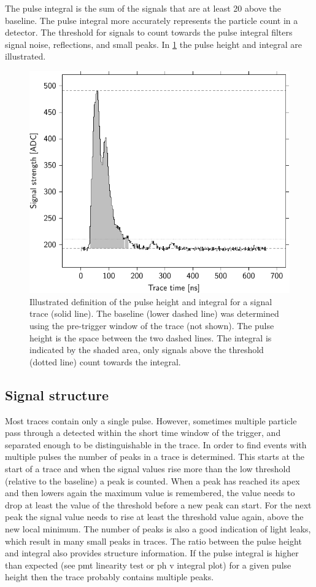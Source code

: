 The pulse integral is the sum of the signals that are at least \SI{20}{\adc} above the baseline. The pulse integral more accurately represents the particle count in a detector. The threshold for signals to count towards the pulse integral filters signal noise, reflections, and small peaks. In \cref{fig:integral} the pulse height and integral are illustrated.

\begin{figure}
    \centering
    \includegraphics[width=0.7\linewidth]{plots/processing/integral}
    \caption{Illustrated definition of the pulse height and integral for a signal trace (solid line). The baseline (lower dashed line) was determined using the pre-trigger window of the trace (not shown). The pulse height is the space between the two dashed lines. The integral is indicated by the shaded area, only signals above the threshold (dotted line) count towards the integral.}
    \label{fig:integral}
\end{figure}


\subsection{Signal structure}

Most traces contain only a single pulse. However, sometimes multiple particle pass through a detected within the short time window of the trigger, and separated enough to be distinguishable in the trace. In order to find events with multiple pulses the number of peaks in a trace is determined. This starts at the start of a trace and when the signal values rise more than the low threshold (relative to the baseline) a peak is counted. When a peak has reached its apex and then lowers again the maximum value is remembered, the value needs to drop at least the value of the threshold before a new peak can start. For the next peak the signal value needs to rise at least the threshold value again, above the new local minimum. The number of peaks is also a good indication of light leaks, which result in many small peaks in traces. The ratio between the pulse height and integral also provides structure information. If the pulse integral is higher than expected (see pmt linearity test or ph v integral plot) for a given pulse height then the trace probably contains multiple peaks.


